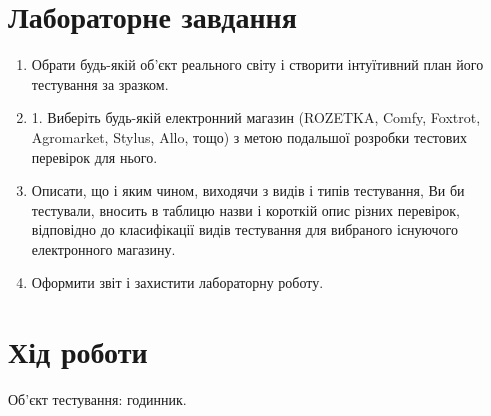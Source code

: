\documentclass[oneside,14pt]{extarticle}
\begin{document}
\begin{normalsize}
    \section*{Лабораторне завдання}
    \begin{enumerate}
    	\item Обрати будь-якій об’єкт реального світу і створити інтуїтивний план
    	його тестування за зразком.
    	\item 1. Виберіть будь-якій електронний магазин (ROZETKA, Comfy, Foxtrot,
    	Agromarket, Stylus, Allo, тощо) з метою подальшої розробки тестових
    	перевірок для нього.
    	\item Описати, що і яким чином, виходячи з видів і типів тестування, Ви би
    	тестували, вносить в таблицю назви і короткій опис різних перевірок,
    	відповідно до класифікації видів тестування для вибраного існуючого
    	електронного магазину.
    	\item Оформити звіт і захистити лабораторну роботу.
    \end{enumerate}
	\section*{Хід роботи}
	
	Об'єкт тестування: годинник.
	

\end{normalsize}
\end{document}
